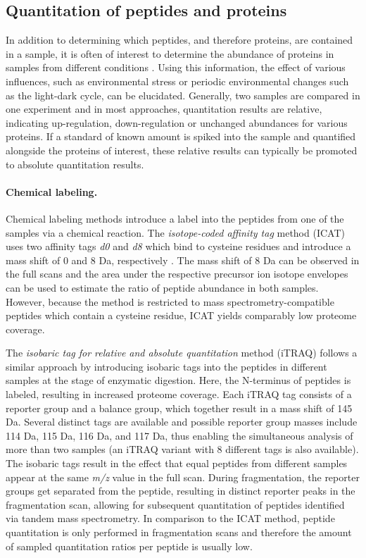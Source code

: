 \subsection{Quantitation of peptides and proteins}

In addition to determining which peptides, and therefore proteins, are 
contained in a sample, it is often of interest to determine the abundance
of proteins in samples from different conditions \citep{Schulze2010}.
Using this information, the effect of various influences, such as environmental 
stress or periodic environmental changes such as the light-dark cycle,
can be elucidated.
Generally, two samples are compared in one experiment and in most approaches, 
quantitation results are relative, indicating up-regulation, down-regulation 
or unchanged abundances for various proteins.
If a standard of known amount is spiked into the sample and quantified alongside
the proteins of interest, these relative results can typically be promoted to 
absolute quantitation results.

\paragraph{Chemical labeling.}

Chemical labeling methods introduce a label into the peptides from one of the 
samples via a chemical reaction. 
The {\em isotope-coded affinity tag} method (ICAT) 
uses two affinity tags {\em d0} and {\em d8} which bind to cysteine residues
and introduce a mass shift of 0 and 8 Da, respectively \citep{Gygi1999}.
The mass shift of 8 Da can be observed in the full scans and the area under
the respective precursor ion isotope envelopes can be used to estimate
the ratio of peptide abundance in both samples.
However, because the method is restricted to mass spectrometry-compatible 
peptides which contain a cysteine residue, ICAT yields comparably low proteome
coverage.

The {\em isobaric tag for relative and absolute quantitation} method (iTRAQ)
follows a similar approach by introducing isobaric tags into the peptides in
different samples \citep{Ross2004} at the stage of enzymatic digestion.
Here, the N-terminus of peptides is labeled, resulting in increased proteome
coverage.
Each iTRAQ tag consists of a reporter group and a balance group, which together 
result in a mass shift of 145 Da. 
Several distinct tags are available and possible reporter group masses 
include 114 Da, 115 Da, 116 Da, and 117 Da, thus enabling the simultaneous 
analysis of more than two samples (an iTRAQ variant with 8 different tags is also
available).
The isobaric tags result in the effect that equal peptides from different 
samples appear at the same {\em m/z} value in the full scan.
During fragmentation, the reporter groups get separated from the peptide, 
resulting in distinct reporter peaks in the fragmentation scan, allowing
for subsequent quantitation of peptides identified via tandem mass spectrometry.
In comparison to the ICAT method, peptide quantitation is only performed in 
fragmentation scans and therefore the amount of sampled quantitation ratios 
per peptide is usually low.

